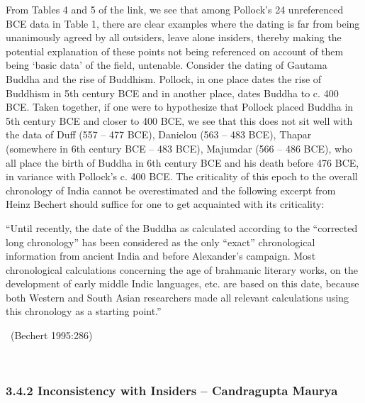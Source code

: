 From Tables 4 and 5 of the link, we see that among Pollock’s 24 unreferenced BCE data in Table 1, there are clear examples where the dating is far from being unanimously agreed by all outsiders, leave alone insiders, thereby making the potential explanation of these points not being referenced on account of them being ‘basic data’ of the field, untenable. Consider the dating of Gautama Buddha and the rise of Buddhism. Pollock, in one place dates the rise of Buddhism in 5th century BCE and in another place, dates Buddha to c. 400 BCE. Taken together, if one were to hypothesize that Pollock placed Buddha in 5th century BCE and closer to 400 BCE, we see that this does not sit well with the data of Duff (557 – 477 BCE), Danielou (563 – 483 BCE), Thapar (somewhere in 6th century BCE – 483 BCE), Majumdar (566 – 486 BCE), who all place the birth of Buddha in 6th century BCE and his death before 476 BCE, in variance with Pollock’s c. 400 BCE. The criticality of this epoch to the overall chronology of India cannot be overestimated and the following excerpt from Heinz Bechert should suffice for one to get acquainted with its criticality:

\begin{myquote}
“Until recently, the date of the Buddha as calculated according to the “corrected long chronology” has been considered as the only “exact” chronological information from ancient India and before Alexander’s campaign. Most chronological calculations concerning the age of brahmanic literary works, on the development of early middle Indic languages, etc. are based on this date, because both Western and South Asian researchers made all relevant calculations using this chronology as a starting point.” 

~\hfill (Bechert 1995:286)
\end{myquote}

~
\vspace{-0.8cm}

\subsubsection*{3.4.2 Inconsistency with Insiders – Candragupta Maurya}

